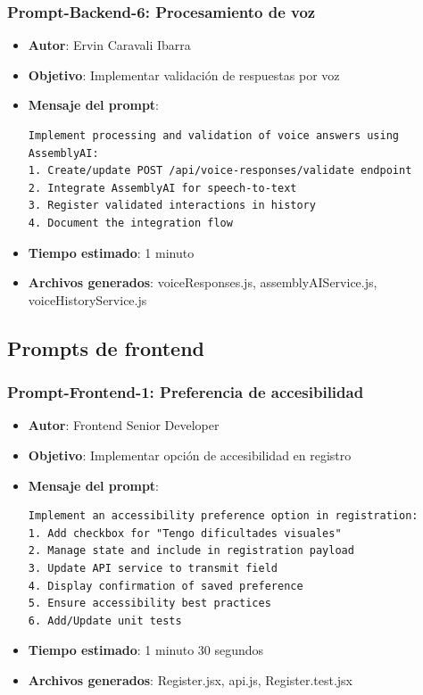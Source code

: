 \documentclass[12pt]{article}
\begin{document}
\subsubsection{Prompt-Backend-6: Procesamiento de voz}
\begin{itemize}
    \item \textbf{Autor}: Ervin Caravali Ibarra
    \item \textbf{Objetivo}: Implementar validación de respuestas por voz
    \item \textbf{Mensaje del prompt}:
    \begin{verbatim}
Implement processing and validation of voice answers using AssemblyAI:
1. Create/update POST /api/voice-responses/validate endpoint
2. Integrate AssemblyAI for speech-to-text
3. Register validated interactions in history
4. Document the integration flow
    \end{verbatim}
    \item \textbf{Tiempo estimado}: 1 minuto
    \item \textbf{Archivos generados}: voiceResponses.js, assemblyAIService.js, voiceHistoryService.js
\end{itemize}

\subsection{Prompts de frontend}

\subsubsection{Prompt-Frontend-1: Preferencia de accesibilidad}
\begin{itemize}
    \item \textbf{Autor}: Frontend Senior Developer
    \item \textbf{Objetivo}: Implementar opción de accesibilidad en registro
    \item \textbf{Mensaje del prompt}:
    \begin{verbatim}
Implement an accessibility preference option in registration:
1. Add checkbox for "Tengo dificultades visuales"
2. Manage state and include in registration payload
3. Update API service to transmit field
4. Display confirmation of saved preference
5. Ensure accessibility best practices
6. Add/Update unit tests
    \end{verbatim}
    \item \textbf{Tiempo estimado}: 1 minuto 30 segundos
    \item \textbf{Archivos generados}: Register.jsx, api.js, Register.test.jsx
\end{itemize}
\end{document}
